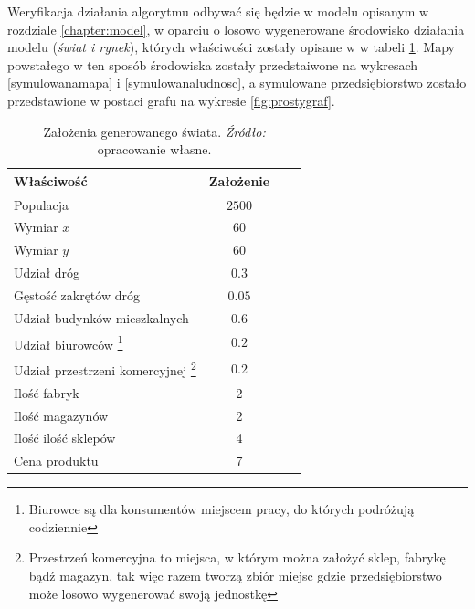 \documentclass[polish, twoside, 12pt, a4paper]{article}
\theoremstyle{definition}
\theoremstyle{plain}
\theoremstyle{remark}
\begin{document}
Weryfikacja działania algorytmu odbywać się będzie w modelu opisanym w rozdziale \ref{chapter:model}, w oparciu o losowo wygenerowane środowisko działania modelu (\textit{świat i rynek}), których właściwości zostały opisane w w tabeli \ref{tab:zalozenia}. Mapy powstałego w ten sposób środowiska zostały przedstaiwone na wykresach \ref{symulowanamapa} i \ref{symulowanaludnosc}, a symulowane przedsiębiorstwo zostało przedstawione w postaci grafu na wykresie \ref{fig:prostygraf}.

\begin{table}[hbt] 
  \centering
  \captionsetup{margin=10pt,font=small,labelfont=bf,width=.8\textwidth}
  \caption[Właściwości generowanego świata]{Założenia generowanego świata. \textit{Źródło:} opracowanie własne.}
  \label{tab:zalozenia}
\vspace*{2ex}
  \begin{tabular}{lccc}
    Właściwość        & Założenie \\ \hline
    Populacja & $2 500$\\
    Wymiar $x$ & $60$\\
    Wymiar $y$ & $60$\\ 
    Udział dróg & $0.3$\\ 
    Gęstość zakrętów dróg & $0.05$\\  
    Udział budynków mieszkalnych & $0.6$\\  
    Udział biurowców \footnote{Biurowce są dla konsumentów miejscem pracy, do których podróżują codziennie} & $0.2$\\  
    Udział przestrzeni komercyjnej \footnote{Przestrzeń komercyjna to miejsca, w którym można założyć sklep, fabrykę bądź magazyn, tak więc razem tworzą zbiór miejsc gdzie przedsiębiorstwo może losowo wygenerować swoją jednostkę}& $0.2$\\  \hline
    Ilość fabryk & 2\\ 
    Ilość magazynów & 2\\ 
    Ilość ilość sklepów & 4\\ 
    Cena produktu & 7\\ 
  \end{tabular}
\end{table}
\end{document}
